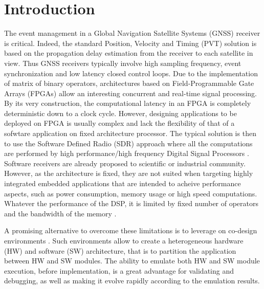 \documentclass[conference]{IEEEtran}
\begin{document}
\section{Introduction}
The event management in a Global Navigation Satellite Systems (GNSS) receiver is critical. Indeed, the standard Position, Velocity and Timing (PVT) solution is based on the propagation delay estimation from the receiver to each satellite in view. Thus GNSS receivers typically involve high sampling frequency, event synchronization and low latency closed control loops. Due to the implementation of matrix of binary operators, architectures based on Field-Programmable Gate Arrays (FPGAs) allow an interesting concurrent and real-time signal processing. By its very construction, the computational latency in an FPGA is completely deterministic down to a clock cycle. However, designing applications to be deployed on FPGA is usually complex and lack the flexibility of that of a sofwtare application on fixed architecture processor. The typical solution is then to use the Software Defined Radio (SDR) approach where all the computations are performed by high performance/high frequency Digital Signal Processors \cite{Maj18}. Software receivers are already proposed to scientific or industrial community. However, as the architecture is fixed, they are not suited when targeting highly integrated embedded applications that are intended to acheive performance aspects, such as power consumption, memory usage or high speed computations. Whatever the performance of the DSP, it is limited by fixed number of operators and the bandwidth of the memory \cite{Row04}.

A promising alternative to overcome these limitations is to leverage on co-design environments \cite{Dion10}. Such environments allow to create a heterogeneous hardware (HW) and software (SW) architecture, that is to partition the application between HW and SW modules. The ability to emulate both HW and SW module execution, before implementation, is a great advantage for validating and debugging, as well as making it evolve rapidly according to the emulation results.  
\end{document}
